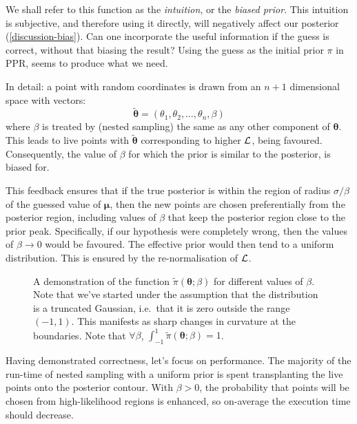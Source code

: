 \documentclass[usenatbib]{mnras}
\begin{document}
We shall refer to this function as the \emph{intuition}, or the \emph{biased
prior}. This intuition is subjective, and therefore using it
directly, will negatively affect our posterior (\vref{discussion-bias}). Can one incorporate the useful
information if the guess is correct, without that biasing the
result? Using the guess as the initial prior \(\pi\) in PPR, seems to
produce what we need.

In detail: a point with random coordinates is drawn from an \(n+1\)
dimensional space with vectors:
\begin{equation}
  \tilde{\bm{\theta}} = (\theta_{1}, \theta_{2}, \ldots, \theta_{n}, \beta)
\end{equation}
where $\beta$ is treated by (nested sampling) the same as any other
component of \(\bm{\theta}\). This leads to live points with
$\tilde{\bm{\theta}}$ corresponding to higher ${\cal L}$, being
favoured. Consequently, the value of $\beta$ for which the prior is
similar to the posterior, is biased for.

This feedback ensures that if the true posterior is within the
region of radius \(\sigma / \beta\) of the guessed value of
\(\bm{\mu}\), then the new points are chosen preferentially from the
posterior region, including values of \(\beta\) that keep the
posterior region close to the prior peak. Specifically, if our
hypothesis were completely wrong, then the values of \(\beta
   \rightarrow 0\) would be favoured. The effective prior would then
tend to a uniform distribution. This is ensured by the
re-normalisation of \({\cal L}\).

\begin{figure}
 
\caption{\label{org44950de}
A demonstration of the function \(\tilde{\pi}(\bm{\theta}; \beta)\) for different values of \(\beta\). Note that we've started under the assumption that the distribution is a truncated Gaussian, i.e.~that it is zero outside the range \((-1, 1)\). This manifests as sharp changes in curvature at the boundaries. Note that \(\forall \beta\), \(\int_{-1}^{1}\tilde{\pi}(\bm{\theta}; \beta) = 1\).}
\end{figure}

Having demonstrated correctness, let's focus on performance. The
majority of the run-time of nested sampling with a uniform prior is
spent transplanting the live points onto the posterior
contour. With \(\beta>0\), the probability that points will be chosen
from high-likelihood regions is enhanced, so on-average the
execution time should decrease.
\end{document}
